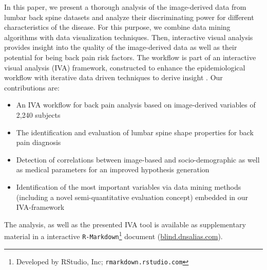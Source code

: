 \documentclass[a4paper,twoside]{style/article}
\begin{document}
In this paper, we present a thorough analysis of the image-derived data from lumbar back spine datasets and analyze their discriminating power for different characteristics of the disease.
For this purpose, we combine data mining algorithms with data visualization techniques.
Then, interactive visual analysis provides insight into the quality of the image-derived data as well as their potential for being back pain risk factors.
The workflow is part of an interactive visual analysis (IVA) framework, constructed to enhance the epidemiological workflow with iterative data driven techniques to derive insight \cite{Klemm2014VIS}.
Our contributions are:
\begin{itemize}
\item An IVA workflow for back pain analysis based on image-derived variables of 2,240 subjects
\item The identification and evaluation of lumbar spine shape properties for back pain diagnosis
\item Detection of correlations between image-based and socio-demographic as well as medical parameters for an improved hypothesis generation
\item Identification of the most important variables via data mining methods (including a novel semi-quantitative evaluation concept) embedded in our IVA-framework
\end{itemize}
The analysis, as well as the presented IVA tool is available as supplementary material in a interactive \texttt{R-Markdown}\footnote{Developed by RStudio, Inc; \texttt{rmarkdown.rstudio.com}} document (\url{blind.dnsalias.com}).
\end{document}

